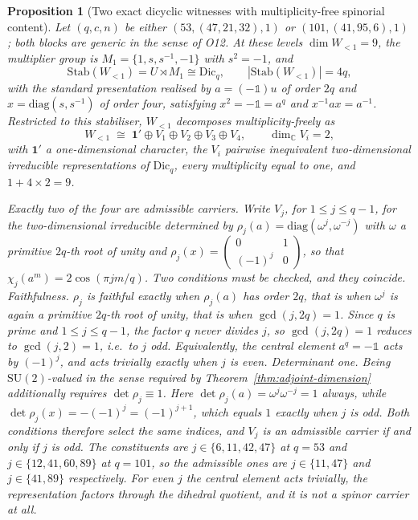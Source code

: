\documentclass[11pt,a4paper]{article}
\newtheorem{proposition}[theorem]{Proposition}
\newcommand{\SU}{\mathrm{SU}}
\begin{document}
    \begin{proposition}[Two exact dicyclic witnesses with multiplicity-free spinorial content]
      \label{prop:dicyclic-witnesses}
      Let $(q, c, n)$ be either $(53, (47,21,32), 1)$ or $(101, (41,95,6), 1)$; both blocks are
      generic in the sense of O12.
      At these levels $\dim W_{<1} = 9$, the multiplier group is
      $M_{1} = \{1, s, s^{-1}, -1\}$ with $s^{2} = -1$, and
      \[
        \mathrm{Stab}(W_{<1}) = U \rtimes M_{1} \cong \mathrm{Dic}_{q},
        \qquad |\mathrm{Stab}(W_{<1})| = 4q,
      \]
      with the standard presentation realised by $a = (-\mathbb 1)u$ of order $2q$ and
      $x = \mathrm{diag}(s,s^{-1})$ of order four, satisfying $x^{2} = -\mathbb 1 = a^{q}$ and
      $x^{-1} a x = a^{-1}$.
      Restricted to this stabiliser, $W_{<1}$ decomposes multiplicity-freely as
      \[
        W_{<1} \;\cong\; \mathbf{1}' \oplus V_{1} \oplus V_{2} \oplus V_{3} \oplus V_{4},
        \qquad \dim_{\mathbb{C}} V_{i} = 2,
      \]
      with $\mathbf{1}'$ a one-dimensional character, the $V_{i}$ pairwise inequivalent
      two-dimensional irreducible representations of $\mathrm{Dic}_{q}$, every multiplicity
      equal to one, and $1 + 4 \times 2 = 9$.

      Exactly two of the four are admissible carriers.
      Write $V_{j}$, for $1 \le j \le q-1$, for the two-dimensional irreducible determined by
      $\rho_{j}(a) = \mathrm{diag}(\omega^{j}, \omega^{-j})$ with $\omega$ a primitive
      $2q$-th root of unity and
      $\rho_{j}(x) = \left(\begin{smallmatrix} 0 & 1 \\ (-1)^{j} & 0 \end{smallmatrix}\right)$,
      so that $\chi_{j}(a^{m}) = 2\cos(\pi j m / q)$.
      Two conditions must be checked, and they coincide.
      \emph{Faithfulness.} $\rho_{j}$ is faithful exactly when $\rho_{j}(a)$ has order $2q$,
      that is when $\omega^{j}$ is again a primitive $2q$-th root of unity, that is when
      $\gcd(j, 2q) = 1$.
      Since $q$ is prime and $1 \le j \le q-1$, the factor $q$ never divides $j$, so
      $\gcd(j, 2q) = 1$ reduces to $\gcd(j,2) = 1$, i.e.\ to $j$ odd.
      Equivalently, the central element $a^{q} = -\mathbb 1$ acts by $(-1)^{j}$, and acts
      trivially exactly when $j$ is even.
      \emph{Determinant one.} Being $\SU(2)$-valued in the sense required by
      Theorem~\ref{thm:adjoint-dimension} additionally requires $\det \rho_{j} \equiv 1$.
      Here $\det \rho_{j}(a) = \omega^{j} \omega^{-j} = 1$ always, while
      $\det \rho_{j}(x) = -(-1)^{j} = (-1)^{j+1}$, which equals $1$ exactly when $j$ is odd.
      Both conditions therefore select the same indices, and $V_{j}$ is an admissible carrier if
      and only if $j$ is odd.
      The constituents are $j \in \{6, 11, 42, 47\}$ at $q = 53$ and
      $j \in \{12, 41, 60, 89\}$ at $q = 101$, so the admissible ones are $j \in \{11, 47\}$
      and $j \in \{41, 89\}$ respectively.
      For even $j$ the central element acts trivially, the representation factors through the
      dihedral quotient, and it is not a spinor carrier at all.
    \end{proposition}
\end{document}
